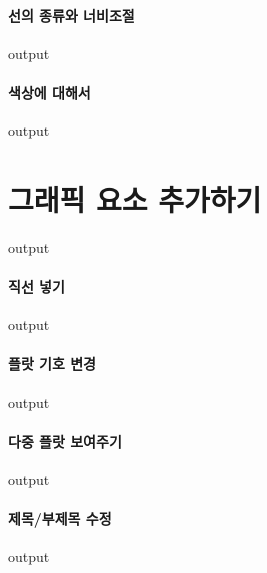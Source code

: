 \paragraph{선의 종류와 너비조절}
\begin{Schunk}
\begin{Soutput}
output
\end{Soutput}
\end{Schunk}

\paragraph{색상에 대해서}
\begin{Schunk}
\begin{Soutput}
output
\end{Soutput}
\end{Schunk}


\section{그래픽 요소 추가하기}
\begin{Schunk}
\begin{Soutput}
output
\end{Soutput}
\end{Schunk}
\paragraph{직선 넣기}
\begin{Schunk}
\begin{Soutput}
output
\end{Soutput}
\end{Schunk}
\paragraph{플랏 기호 변경}
\begin{Schunk}
\begin{Soutput}
output
\end{Soutput}
\end{Schunk}
\paragraph{다중 플랏 보여주기}
\begin{Schunk}
\begin{Soutput}
output
\end{Soutput}
\end{Schunk}
\paragraph{제목/부제목 수정}
\begin{Schunk}
\begin{Soutput}
output
\end{Soutput}
\end{Schunk}
